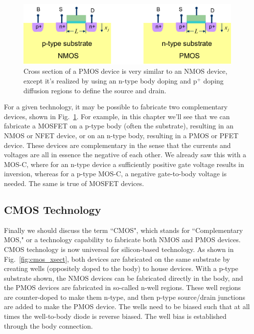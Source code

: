 \begin{figure}[tb]
\begin{center}
\includegraphics[width=.75\columnwidth]{pmos_xsect}
\end{center}
\caption{Cross section of a PMOS device is very similar to an NMOS device, except it's realized by using an n-type body doping and p$^+$ doping diffusion regions to define the source and drain. } \label{fig:pmos_xsect}
\end{figure}

For a given technology, it may be possible to fabricate two complementary devices, shown in Fig.~\ref{fig:pmos_xsect}.  For example, in this chapter we'll see that we can fabricate a MOSFET on a p-type body (often the substrate), resulting in an NMOS or NFET device, or on an n-type body, resulting in a PMOS or PFET device.  These devices are complementary in the sense that the currents and voltages are all in essence the negative of each other.  We already saw this with a MOS-C, where for an n-type device a sufficiently positive gate voltage results in inversion, whereas for a p-type MOS-C, a negative gate-to-body voltage is needed. The same is true of MOSFET devices.

\subsection{CMOS Technology}

 
Finally we should discuss the term ``CMOS", which stands for ``Complementary MOS," or a technology capability to fabricate both NMOS and PMOS devices.  CMOS technology is now universal for silicon-based technology.  As shown in Fig.~\ref{fig:cmos_xsect}, both devices are fabricated on the same substrate by creating wells (oppositely doped to the body) to house devices.  With a p-type substrate shown, the NMOS devices can be fabricated directly in the body, and the PMOS devices are fabricated in so-called n-well regions.  These well regions are counter-doped to make them n-type, and then p-type source/drain junctions are added to make the PMOS device.  The wells need to be biased such that at all times the well-to-body diode is reverse biased.  The well bias is established through the body connection.

